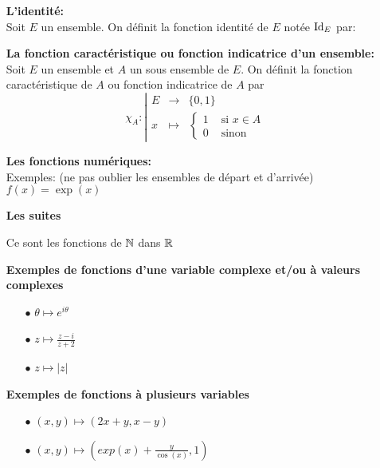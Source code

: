 \documentclass[a4paper, 11pt]{article}
\begin{document}
\begin{enumerate}
	\item[\ding{182}] \textbf{L'identit\'e:}\\
		\noindent Soit $E$ un ensemble. On d\'efinit la fonction identit\'e de $E$ not\'ee $\hbox{Id}_E$ par:

	\item[\ding{183}] \textbf{La fonction caract\'eristique ou fonction indicatrice d'un ensemble:}\\
		\noindent Soit $E$ un ensemble et $A$ un sous ensemble de $E$. On d\'efinit la fonction caract\'eristique de $A$ ou fonction indicatrice de $A$ par
		$$\chi_A: \left| \begin{array}{lll} E & \rightarrow & \{0,1\}                         \\
             x       & \mapsto     & \left\{ \begin{array}{ll}
				                                             1 & \text{ si $x\in A$} \\
				                                             0 & \text{ sinon}
			                                             \end{array}		\right.\end{array} \right. $$
	\item[\ding{184}] \textbf{Les fonctions num\'eriques:}\\
		\noindent Exemples: (ne pas oublier les ensembles de départ et d'arrivée)
		$f(x) = \exp(x)$



	\item[\ding{185}] \textbf{Les suites}

		Ce sont  les fonctions de $\mathbb{N}$ dans $\mathbb{R}$


	\item[\ding{186}] \textbf{Exemples de fonctions d'une variable complexe et/ou \`{a} valeurs complexes}
		\begin{itemize}
			\item[$\bullet$] $\theta\mapsto e^{i\theta}$
			\item[$\bullet$] $z\mapsto \frac{z-i}{z+2}$
			\item[$\bullet$]  $z \mapsto |z|$
		\end{itemize}
		\vsec


	\item[\ding{187}] \textbf{Exemples de fonctions \`{a} plusieurs variables}
		\begin{itemize}
			\item[$\bullet$]  $(x,y) \mapsto (2x+y, x-y)$
			\item[$\bullet$]  $(x,y) \mapsto (exp(x)+\frac{y}{\cos(x)}, 1)$
		\end{itemize}

\end{enumerate}
\end{document}
